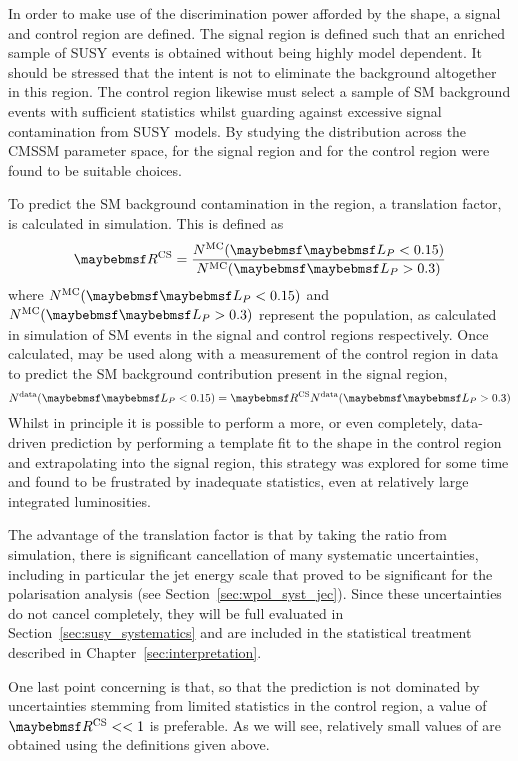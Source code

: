 In order to make use of the discrimination power afforded by the \LP shape, a
signal and control region are defined. The signal region is defined such that an
enriched sample of \ac{SUSY} events is obtained without being highly model
dependent. It should be stressed that the intent is not to eliminate the
background altogether in this region. The control region likewise must select a
sample of \ac{SM} background events with sufficient statistics whilst guarding
against excessive signal contamination from \ac{SUSY} models. By studying the
\LP distribution across the \ac{CMSSM} parameter space, \LPsignal for the signal
region and \LPcontrol for the control region were found to be suitable choices.

To predict the \ac{SM} background contamination in the \LPsignal region, a
translation factor, \RCS is calculated in simulation. This is defined as
\begin{equation}
\RCS = \frac{N^{\textrm{MC}}(\LPsignal)}{N^{\textrm{MC}}(\LPcontrol)}
\end{equation}
where $N^{\textrm{MC}}(\LPsignal)$ and $N^{\textrm{MC}}(\LPcontrol)$ represent
the population, as calculated in simulation of \ac{SM} events in the signal and
control regions respectively. Once calculated, \RCS may be used along with a
measurement of the control region in data to predict the \ac{SM} background
contribution present in the signal region,
\begin{equation}
N^{\textrm{data}}(\LPsignal) = \RCS N^{\textrm{data}}(\LPcontrol)
\end{equation}
Whilst in principle it is possible to perform a more, or even completely,
data-driven prediction by performing a template fit to the \LP shape in the
control region and extrapolating into the signal region, this strategy was
explored for some time and found to be frustrated by inadequate statistics, even
at relatively large integrated luminosities.

The advantage of the translation factor \RCS is that by taking the ratio from
simulation, there is significant cancellation of many systematic uncertainties,
including in particular the jet energy scale that proved to be significant for
the \PW polarisation analysis (see Section~\ref{sec:wpol_syst_jec}). Since these
uncertainties do not cancel completely, they will be full evaluated in
Section~\ref{sec:susy_systematics} and are included in the statistical treatment
described in Chapter~\ref{sec:interpretation}.

One last point concerning \RCS is that, so that the prediction is not dominated
by uncertainties stemming from limited statistics in the control region, a value
of $\RCS << 1$ is preferable. As we will see, relatively small values of \RCS
are obtained using the definitions given above.

